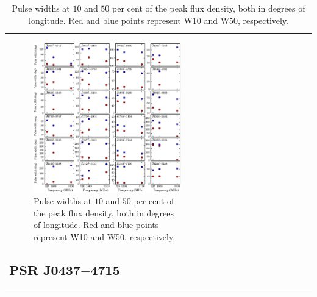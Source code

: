 \documentclass[useAMS,usenatbib]{mn2e}
\begin{document}
\begin{table}
\begin{center}
\begin{tabular}{lcccccccccccc}
\begin{figure}
\begin{center}
\includegraphics[width=6 in]{w50.ps}
\caption{Pulse widths at $10$ and $50$ per cent of the peak flux density, 
both in degrees of longitude. Red and blue points represent W10 and W50, respectively.}
\label{w50}
\end{center}
\end{figure}

\subsection{PSR J0437$-$4715}


\end{tabular}
\end{center}
\end{table}
\end{document}
